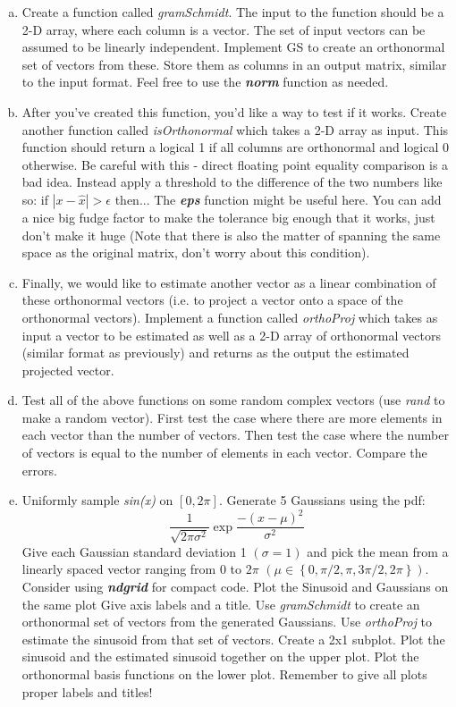 \documentclass[11pt]{article}
\begin{document}
\begin{enumerate}[a.]
    \item Create a function called \emph{gramSchmidt}.  
    The input to the function should be a 2-D array, 
    where each column is a vector.
    The set of input vectors can be assumed to be linearly independent. 
    Implement GS to create an orthonormal set of vectors from these.
    Store them as columns in an output matrix, similar to the input format.
    Feel free to use the \textbf{\textit{norm}} function as needed.

    \item After you've created this function, you'd like a way to test if it works.
    Create another function called \emph{isOrthonormal} which takes a 2-D array as input.
    This function should return a logical 1 if all columns are orthonormal and logical 0 otherwise.
    Be careful with this - direct floating point equality comparison is a bad idea.
    Instead apply a threshold to the difference of the two numbers like so:
    if $|x-\hat{x}| > \epsilon$ then... The \textbf{\textit{eps}} function might be useful here.
    You can add a nice big fudge factor to make the tolerance big enough that it works,
    just don't make it huge
    (Note that there is also the matter of spanning the same space as the original matrix,
    don't worry about this condition).

    \item Finally, we would like to estimate another vector as a linear combination of
    these orthonormal vectors (i.e. to project a vector onto a space of the orthonormal vectors).
    Implement a function called \emph{orthoProj} which takes as input a vector to be estimated 
    as well as a 2-D array of orthonormal vectors (similar format as previously) and returns
    as the output the estimated projected vector.

    \item Test all of the above functions on some random complex vectors (use \emph{rand} to
    make a random vector).
    First test the case where there are more elements in each vector than the number of vectors.
    Then test the case where the number of vectors is equal to the number of elements in each vector.
    Compare the errors.

    \item Uniformly sample \emph{sin(x)} on $[0, 2\pi]$. Generate 5 Gaussians using the pdf:
    $$
    \frac{1}{\sqrt{2\pi \sigma^2}}\exp{\frac{-(x-\mu)^2}{\sigma^2}}
    $$
    Give each Gaussian standard deviation 1 $(\sigma = 1)$ and pick the mean from a linearly
    spaced vector ranging from $0$ to $2\pi$ $(\mu \in \left\{0, \pi/2, \pi, 3\pi/2, 2\pi\right\})$.
    Consider using \textit{\textbf{ndgrid}} for compact code. 
    Plot the Sinusoid and Gaussians on the same plot
    Give axis labels and a title.
    Use \emph{gramSchmidt} to create an orthonormal set of vectors from the generated Gaussians.
    Use \emph{orthoProj} to estimate the sinusoid from that set of vectors.
    Create a 2x1 subplot.
    Plot the sinusoid and the estimated sinusoid together on the upper plot.
    Plot the orthonormal basis functions on the lower plot.
    Remember to give all plots proper labels and titles!

\end{enumerate}
\end{document}
